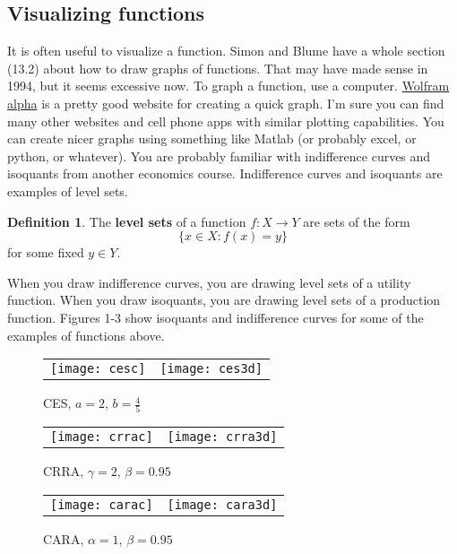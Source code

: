 \documentclass[12pt,reqno]{amsart}
\theoremstyle{definition}
\newtheorem{definition}{Definition}[section]
\renewcommand{\to}{{\rightarrow}}
\begin{document}
\subsection{Visualizing functions}
It is often useful to visualize a function. Simon and Blume have a
whole section (13.2) about how to draw graphs of functions. That may
have made sense in 1994, but it seems excessive now. To graph a
function, use a computer. \href{http://wolframalpha.com}{Wolfram
  alpha} is a pretty good website for creating a quick graph.  I'm
sure you can find many other websites and cell phone apps with similar
plotting capabilities. You can create nicer graphs using something
like Matlab (or probably excel, or python, or whatever).  You are
probably familiar with indifference curves and isoquants from another
economics course. Indifference curves and isoquants are examples of
level sets.
\begin{definition}
  The \textbf{level sets} of a function $f:X\to Y$ are sets of the
  form 
  \[ \{ x \in X: f(x) = y \} \]
  for some fixed $y \in Y$.
\end{definition}
When you draw indifference curves, you are drawing level sets of a
utility function. When you draw isoquants, you are drawing level sets
of a production function. Figures 1-3 show isoquants and indifference
curves for some of the examples of functions above. 

\begin{figure}
  \caption{CES, $a = 2$, $b = \frac{4}{5}$}
  \begin{tabular}{cc}
    \texttt{[image: cesc]} &
    \texttt{[image: ces3d]} 
  \end{tabular}
\end{figure}

\begin{figure}
  \caption{CRRA, $\gamma = 2$, $\beta = 0.95$}
  \begin{tabular}{cc}
    \texttt{[image: crrac]} &
    \texttt{[image: crra3d]} 
  \end{tabular}
\end{figure}

\begin{figure}
  \caption{CARA, $\alpha = 1$, $\beta = 0.95$}
  \begin{tabular}{cc}
    \texttt{[image: carac]} &
    \texttt{[image: cara3d]} 
  \end{tabular}
\end{figure}
\end{document}
